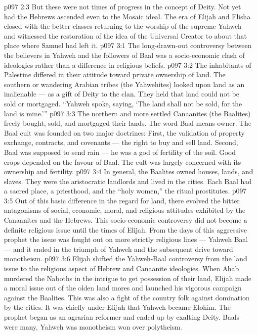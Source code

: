 \vs p097 2:3 But these were not times of progress in the concept of Deity. Not yet had the Hebrews ascended even to the Mosaic ideal. The era of Elijah and Elisha closed with the better classes returning to the worship of the supreme Yahweh and witnessed the restoration of the idea of the Universal Creator to about that place where Samuel had left it.
\vs p097 3:1 The long\hyp{}drawn\hyp{}out controversy between the believers in Yahweh and the followers of Baal was a socio\hyp{}economic clash of ideologies rather than a difference in religious beliefs.
\vs p097 3:2 \pc The inhabitants of Palestine differed in their attitude toward private ownership of land. The southern or wandering Arabian tribes (the Yahwehites) looked upon land as an inalienable --- as a gift of Deity to the clan. They held that land could not be sold or mortgaged. “Yahweh spoke, saying, ‘The land shall not be sold, for the land is mine.’”
\vs p097 3:3 The northern and more settled Canaanites (the Baalites) freely bought, sold, and mortgaged their lands. The word Baal means owner. The Baal cult was founded on two major doctrines: First, the validation of property exchange, contracts, and covenants --- the right to buy and sell land. Second, Baal was supposed to send rain --- he was a god of fertility of the soil. Good crops depended on the favour of Baal. The cult was largely concerned with  its ownership and fertility.
\vs p097 3:4 In general, the Baalites owned houses, lands, and slaves. They were the aristocratic landlords and lived in the cities. Each Baal had a sacred place, a priesthood, and the “holy women,” the ritual prostitutes.
\vs p097 3:5 Out of this basic difference in the regard for land, there evolved the bitter antagonisms of social, economic, moral, and religious attitudes exhibited by the Canaanites and the Hebrews. This socio\hyp{}economic controversy did not become a definite religious issue until the times of Elijah. From the days of this aggressive prophet the issue was fought out on more strictly religious lines --- Yahweh  Baal --- and it ended in the triumph of Yahweh and the subsequent drive toward monotheism.
\vs p097 3:6 Elijah shifted the Yahweh\hyp{}Baal controversy from the land issue to the religious aspect of Hebrew and Canaanite ideologies. When Ahab murdered the Naboths in the intrigue to get possession of their land, Elijah made a moral issue out of the olden land mores and launched his vigorous campaign against the Baalites. This was also a fight of the country folk against domination by the cities. It was chiefly under Elijah that Yahweh became Elohim. The prophet began as an agrarian reformer and ended up by exalting Deity. Baals were many, Yahweh was  monotheism won over polytheism.
